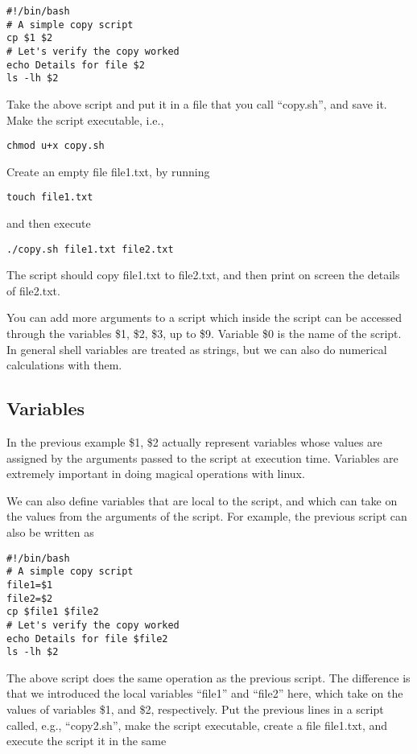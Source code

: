 \documentclass[aps,showpacs,prd,notitlepage,preprintnumbers,amsmath,amssymb,letterpaper]{revtex4}
\begin{document}
\begin{verbatim}
#!/bin/bash
# A simple copy script
cp $1 $2
# Let's verify the copy worked
echo Details for file $2
ls -lh $2
\end{verbatim}

Take the above script and put it in a file that you call ``copy.sh'', and
save it. Make the script executable, i.e.,

\begin{verbatim}
chmod u+x copy.sh
\end{verbatim}

Create an empty file file1.txt, by running

\begin{verbatim}
touch file1.txt
\end{verbatim}

and then execute

\begin{verbatim}
./copy.sh file1.txt file2.txt
\end{verbatim}

The script should copy file1.txt to file2.txt, and then print on screen the details of file2.txt. 

You can add more arguments to a script which inside the script can be
accessed through the variables \$1, \$2, \$3, up to \$9. Variable \$0
is the name of the script. In general shell variables are treated as
strings, but we can also do numerical calculations with them. 


\subsection{Variables}

In the previous example \$1, \$2 actually represent variables whose
values are assigned by the arguments passed to the script at execution
time. Variables are extremely important in doing magical operations
with linux.

We can also define variables that are local to the script, and which can
take on the values from the arguments of the script. For example, the
previous script can also be written as

\begin{verbatim}
#!/bin/bash
# A simple copy script
file1=$1
file2=$2
cp $file1 $file2
# Let's verify the copy worked
echo Details for file $file2
ls -lh $2
\end{verbatim}

The above script does the same operation as the previous script. The
difference is that we introduced the local variables ``file1'' and
``file2'' here, which take on the values of variables \$1, and \$2,
respectively. Put the previous lines in a script called, e.g.,
``copy2.sh'', make the script executable, create a file file1.txt, and
execute the script it in the same
\end{document}
